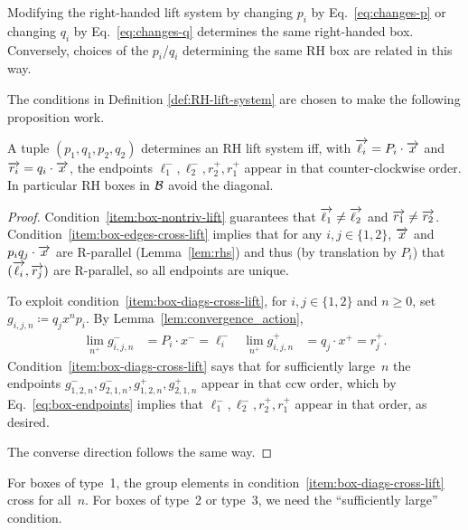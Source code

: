 \begin{remark}
\label{rmk:box_from_system}
Modifying the right-handed lift system by changing $p_i$ by
Eq.~\eqref{eq:changes-p} or changing $q_i$ by Eq.~\eqref{eq:changes-q} determines
the same right-handed box. Conversely, choices of the $p_i$/$q_i$
determining the same RH box are related in this way.
\end{remark}
The conditions in Definition \ref{def:RH-lift-system} are chosen to
make the following proposition work.
\begin{proposition}\label{prop:rh-boxes}
  A tuple $(p_1,q_1,p_2,q_2)$ determines an RH lift system iff, with $\overrightarrow{\ell_i} =
  P_i \cdot \overrightarrow{x}$ and $\overrightarrow{r_i} = q_i \cdot \overrightarrow{x}$, the endpoints $\ell_1^-, \ell_2^-, r_2^+, r_1^+$ appear in that counter-clockwise order. In particular RH boxes in $\mathcal{B}$ avoid the diagonal.
\end{proposition}
\begin{proof}
Condition~\ref{item:box-nontriv-lift} guarantees that $\overrightarrow{\ell_1} \ne \overrightarrow{\ell_2}$ and $\overrightarrow{r_1} \ne \overrightarrow{r_2}$. Condition~\ref{item:box-edges-cross-lift} implies that for any $i,j \in \{1,2\}$, $\overrightarrow{x}$ and $p_iq_j\cdot \overrightarrow{x}$ are R-parallel (Lemma~\ref{lem:rhs}) and thus (by translation by $P_i$) that $(\overrightarrow{\ell_i}, \overrightarrow{r_j})$ are R-parallel, so all endpoints are unique.

  To exploit condition~\ref{item:box-diags-cross-lift}, for $i,j \in \{1,2\}$ and $n \ge 0$, set $g_{i,j,n} \coloneqq q_j x^n p_i$. By Lemma~\ref{lem:convergence_action}, \begin{align}\label{eq:box-endpoints}
    \lim_{n^+} g_{i,j,n}^- &= P_i \cdot x^- = \ell_i^- &
    \lim_{n^+} g_{i,j,n}^+ &= q_j \cdot x^+ = r_j^+.
  \end{align}
  Condition~\ref{item:box-diags-cross-lift} says that for sufficiently large~$n$ the endpoints $g_{1,2,n}^-, g_{2,1,n}^-, g_{1,2,n}^+, g_{2,1,n}^+$ appear in that ccw order, which by Eq.~\eqref{eq:box-endpoints} implies that $\ell_1^-,\ell_2^-,r_2^+,r_1^+$ appear in that order, as desired.

  The converse direction follows the same way.
\end{proof}

\begin{remark}
\label{rmk:largeenough}
  For boxes of type~1, the group elements in condition~\ref{item:box-diags-cross-lift} cross for all~$n$. For boxes of type~2 or type~3, we need the ``sufficiently large'' condition.
\end{remark}

